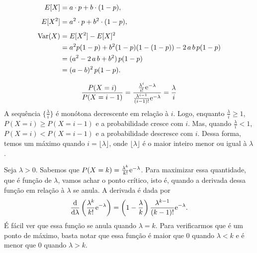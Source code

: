 \begin{questions}
\setcounter{question}{7}
\begin{solution}
	\begin{align*}
		E[X] &= a\cdot p+b\cdot(1-p),\\[1ex]
        E[X^2] &= a^2\cdot p+b^2\cdot(1-p),\\[1ex]
        \mathrm{Var}(X) &= E[X^2]-E[X]^2\\
        	&= a^2p(1-p)+b^2(1-p)(1-(1-p))-2\,a\,b\,p(1-p)\\
            &= (a^2-2\,a\,b+b^2)\,p(1-p)\\
            &= (a-b)^2\,p(1-p).
	\end{align*}
\end{solution}

\setcounter{question}{15}
\begin{solution}
	\begin{align*}
		\frac{P(X=i)}{P(X=i-1)}
        	= \frac{\frac{\lambda^i}{i!}\mathrm{e}^{-\lambda}}
            	{\frac{\lambda^{i-1}}{(i-1)!}\mathrm{e}^{-\lambda}}
            = \frac{\lambda}{i}
	\end{align*}
    A sequência $\{\frac{\lambda}{i}\}$ é monótona decrescente em relação à $i$. Logo, enquanto $\frac{\lambda}{i} \ge 1$, $P(X=i) \ge P(X=i-1)$ e a probabilidade cresce com $i$. Mas, quando $\frac{\lambda}{i} < 1$, $P(X=i) < P(X=i-1)$ e a probabilidade descresce com $i$. Dessa forma, temos um máximo quando $i = \lfloor\lambda\rfloor$, onde $\lfloor\lambda\rfloor$ é o maior inteiro menor ou igual à $\lambda$.
\end{solution}

\setcounter{question}{17}
\begin{solution}
	Seja $\lambda>0$. Sabemos que $P(X=k)=\frac{\lambda^k}{k!}\mathrm{e}^{-\lambda}$. Para maximizar essa quantidade, que é função de $\lambda$, vamos achar o ponto crítico, isto é, quando a derivada dessa função em relação à $\lambda$ se anula. A derivada é dada por
    \begin{align*}
    	\dfrac{\mathrm{d}}{\mathrm{d}\lambda}
        		\left(\frac{\lambda^k}{k!}\mathrm{e}^{-\lambda}\right)
        	= \left( 1 - \frac{\lambda}{k} \right)
            	\frac{\lambda^{k-1}}{(k-1)!}\mathrm{e}^{-\lambda}.
    \end{align*}
    É fácil ver que essa função se anula quando $\lambda = k$. Para verificarmos que é um ponto de máximo, basta notar que essa função é maior que 0 quando $\lambda < k$ e é menor que 0 quando $\lambda > k$.
\end{solution}

\end{questions}